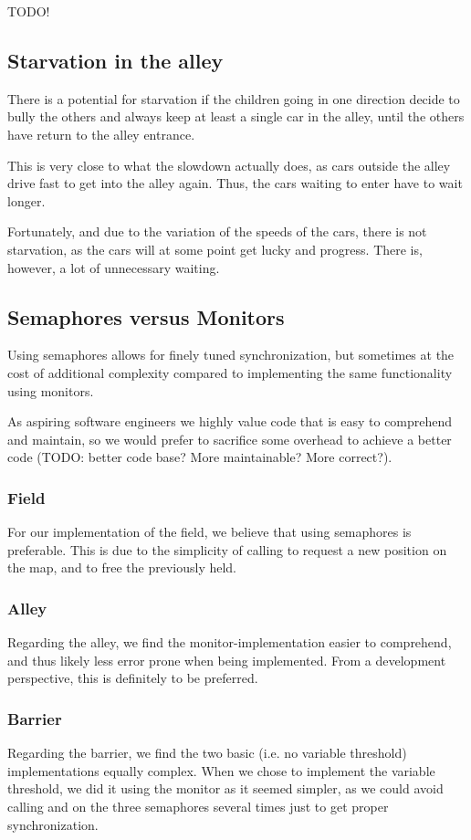 
TODO!

\subsection{Starvation in the alley}
There is a potential for starvation if the children going in one direction decide to bully the others and always keep at least a single car in the alley, until the others have return to the alley entrance.

This is very close to what the slowdown actually does, as cars outside the alley drive fast to get into the alley again. Thus, the cars waiting to enter have to wait longer.

Fortunately, and due to the variation of the speeds of the cars, there is not starvation, as the cars will at some point get lucky and progress. There is, however, a lot of unnecessary waiting.

\subsection{Semaphores versus Monitors}
\label{sub:disc-sema-moni}
Using semaphores allows for finely tuned synchronization, but sometimes at the cost of additional complexity compared to implementing the same functionality using monitors.

As aspiring software engineers we highly value code that is easy to comprehend and maintain, so we would prefer to sacrifice some overhead to achieve a better code (TODO: better code base? More maintainable? More correct?).

\subsubsection{Field}
\label{subsub:disc-field}
For our implementation of the field, we believe that using semaphores is preferable. This is due to the simplicity of calling  to request a new position on the map, and  to free the previously held.

\subsubsection{Alley}
\label{subsub:disc-alley}
Regarding the alley, we find the monitor-implementation easier to comprehend, and thus likely less error prone when being implemented. From a development perspective, this is definitely to be preferred.


\subsubsection{Barrier}
\label{subsub:disc-barrier}
Regarding the barrier, we find the two basic (i.e. no variable threshold) implementations equally complex. When we chose to implement the variable threshold, we did it using the monitor as it seemed simpler, as we could avoid calling  and  on the three semaphores several times just to get proper synchronization.